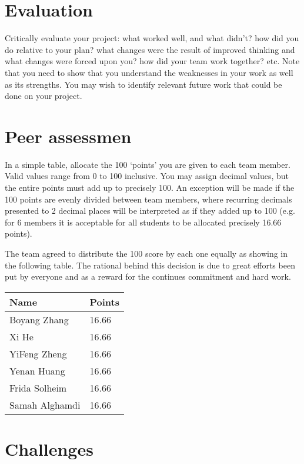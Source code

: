 \documentclass{article}
\begin{document}
\section{Evaluation}
Critically evaluate your project: what worked well, and what didn’t? how did you do relative to your plan? what changes were the result of improved thinking and what changes were forced upon you? how did your team work together? etc. Note that you need to show that you understand the weaknesses in your work as well as its strengths. You may wish to identify relevant future work that could be done on your project.

\section{Peer assessmen}
In a simple table, allocate the 100 ‘points’ you are given to each team member. Valid values range from 0 to 100 inclusive. You may assign decimal values, but the entire points must add up to precisely 100. An exception will be made if the 100 points are evenly divided between team members, where recurring decimals presented to 2 decimal places will be interpreted as if they added up to 100 (e.g. for 6 members it is acceptable for all students to be allocated precisely 16.66 points).

The team agreed to distribute the 100 score by each one equally as showing in the following table. The rational behind this decision is due to great efforts been put by everyone and as a reward for the continues commitment and hard work.


\begin{center}
\begin{tabular}{ | m{3cm}| m{1.3cm} | }
\hline
\textbf{Name} & \textbf{Points}  \\
\hline
Boyang Zhang & 16.66  \\
\hline
Xi He & 16.66  \\
\hline
YiFeng Zheng & 16.66 \\
\hline
Yenan Huang & 16.66 \\
\hline
Frida Solheim & 16.66 \\
\hline
Samah Alghamdi & 16.66 \\
\hline
\end{tabular}
\end{center}


\section{Challenges}
\end{document}
